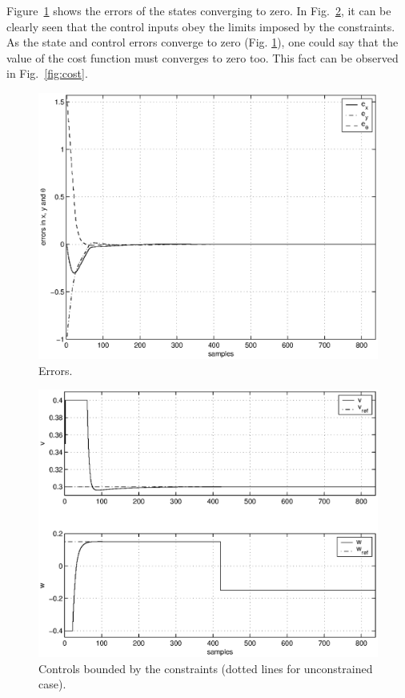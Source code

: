\documentclass[conference]{IEEEtran} %
\begin{document}
Figure~\ref{fig:errors} shows the errors of the states converging to zero. In Fig.~\ref{fig:controls}, it can be clearly seen that the control inputs obey the limits imposed by the constraints. As the state and control errors converge to zero (Fig. \ref{fig:errors}), one could say that the value of the cost function must converges to zero too. This fact can be observed in Fig.~\ref{fig:cost}.

\begin{figure}\begin{center}
    \includegraphics[width=.99\linewidth]{Figures/errors.eps}
    \caption{Errors.}
    \label{fig:errors}
\end{center}\end{figure}
\begin{figure}\begin{center}
    \includegraphics[width=.99\linewidth]{Figures/controls.eps}
    \caption{Controls bounded by the constraints (dotted lines for unconstrained case).}
    \label{fig:controls}
\end{center}\end{figure}
\end{document}
